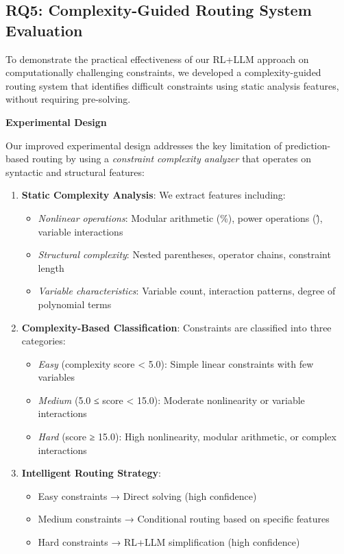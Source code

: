 
\subsection{RQ5: Complexity-Guided Routing System Evaluation}
\label{sec:complexity-routing}

To demonstrate the practical effectiveness of our RL+LLM approach on computationally challenging constraints, we developed a complexity-guided routing system that identifies difficult constraints using static analysis features, without requiring pre-solving.

\textbf{Experimental Design}

Our improved experimental design addresses the key limitation of prediction-based routing by using a \textit{constraint complexity analyzer} that operates on syntactic and structural features:

\begin{enumerate}
    \item \textbf{Static Complexity Analysis}: We extract features including:
    \begin{itemize}
        \item \textit{Nonlinear operations}: Modular arithmetic (\%), power operations (\^), variable interactions
        \item \textit{Structural complexity}: Nested parentheses, operator chains, constraint length
        \item \textit{Variable characteristics}: Variable count, interaction patterns, degree of polynomial terms
    \end{itemize}
    
    \item \textbf{Complexity-Based Classification}: Constraints are classified into three categories:
    \begin{itemize}
        \item \textit{Easy} (complexity score < 5.0): Simple linear constraints with few variables
        \item \textit{Medium} (5.0 ≤ score < 15.0): Moderate nonlinearity or variable interactions
        \item \textit{Hard} (score ≥ 15.0): High nonlinearity, modular arithmetic, or complex interactions
    \end{itemize}
    
    \item \textbf{Intelligent Routing Strategy}:
    \begin{itemize}
        \item Easy constraints → Direct solving (high confidence)
        \item Medium constraints → Conditional routing based on specific features
        \item Hard constraints → RL+LLM simplification (high confidence)
    \end{itemize}
\end{enumerate}


